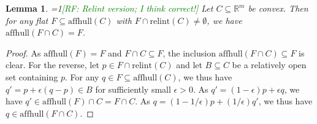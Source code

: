 \documentclass{article}
\newcommand{\Comments}{1}
\newcommand{\mynote}[2]{\ifnum\Comments=1\textcolor{#1}{#2}\fi}
\newcommand{\raf}[1]{\mynote{green}{[RF: #1]}}
\newcommand{\reals}{\mathbb{R}}
\newcommand{\simplex}{\Delta_\Y}
\newcommand{\relint}[1]{\mathrm{relint}(#1)}
\newcommand{\affhull}{\mathrm{affhull}}
\newcommand{\R}{\mathcal{R}}
\newcommand{\Y}{\mathcal{Y}}
\newtheorem{lemma}{Lemma}
\newtheorem{definition}{Definition}
\begin{document}
\begin{lemma}\label{lem:affhull-relint}
  \raf{Relint version; I think correct!}
  Let $C\subseteq\reals^m$ be convex.
  Then for any flat $F\subseteq\affhull(C)$ with $F\cap\relint C \neq \emptyset$, we have $\affhull(F\cap C) = F$.
\end{lemma}
\begin{proof}
  As $\affhull(F) = F$ and $F\cap C\subseteq F$, the inclusion $\affhull(F\cap C) \subseteq F$ is clear.
  For the reverse, let $p\in F\cap\relint C$ and let $B\subseteq C$ be a relatively open set containing $p$.
  For any $q\in F \subseteq \affhull(C)$, we thus have $q' = p + \epsilon (q-p) \in B$ for sufficiently small $\epsilon > 0$.
  As $q' = (1-\epsilon) p + \epsilon q$, we have $q' \in \affhull(F)\cap C = F\cap C$.
  As $q = (1-1/\epsilon) p + (1/\epsilon) q'$, we thus have $q\in\affhull(F\cap C)$.
\end{proof}


\end{document}
